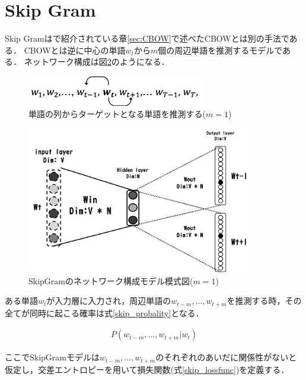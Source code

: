 \documentclass[a4j,11pt,report]{jsbook}
\begin{document}
\clearpage

\section{Skip Gram \label{sec:SkipGram}}
Skip Gramは\cite{SkipCBOW}で紹介されている章\ref{sec:CBOW}で述べたCBOWとは別の手法である．
CBOWとは逆に中心の単語$w_{t}$から$m$個の周辺単語を推測するモデルである．
ネットワーク構成は図\ref{fig:SkipGramimage}のようになる．

\begin{figure}[H]
 \centering
\includegraphics[width = 80mm]{image/skipgram_w1w2wt-1wtwt+1.png}
 \caption{単語の列からターゲットとなる単語を推測する($m = 1$)}
 \label{fig:Skipformula}
\end{figure}


\begin{figure}[H]
 \centering
\includegraphics[width = 100mm]{image/SkipGram_windowsize_1.png}
 \caption{SkipGramのネットワーク構成モデル模式図($ m = 1$) }
 \label{fig:SkipGramimage}
\end{figure}



ある単語$w_{t}$が入力層に入力され，周辺単語の$w_{t-m},...,w_{t+m}$を推測する時，その全てが同時に起こる確率は式\ref{skip_probality}となる．

\begin{equation}
  \label{skip_probality}
  \begin{array}{c}
  P(w_{t-m},...,w_{t+m}|w_{t})
  \end{array}
\end{equation}

ここでSkipGramモデルは$w_{t-m},...,w_{t+m}$のそれぞれのあいだに関係性がないと仮定し，交差エントロピーを用いて損失関数(式\ref{skip_lossfunc})を定義する．
\end{document}
